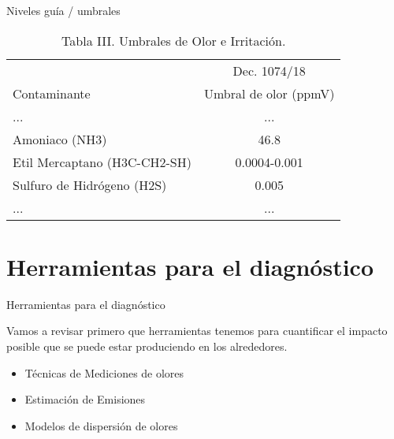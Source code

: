    
\begin{frame}{Niveles guía / umbrales}
    \begin{table}[]
        \centering
        \begin{tabular}{| l | c |}\hline
                          & Dec. 1074/18           \\
             Contaminante & Umbral de olor (ppmV)  \\\hline
             ... & ...    \\
             Amoniaco (NH3)             &   46.8  \\
             Etil Mercaptano (H3C-CH2-SH)           &   0.0004-0.001  \\ 
             Sulfuro de Hidrógeno (H2S) &   0.005  \\
             ... & ...    \\\hline
        \end{tabular}
        \caption{Tabla III. Umbrales de Olor e Irritación.}
    \end{table}
\end{frame}



\section{Herramientas para el diagnóstico}

\begin{frame}{Herramientas para el diagnóstico}

Vamos a revisar primero que herramientas tenemos para cuantificar el impacto posible que se puede estar produciendo en los alrededores.

\begin{itemize}
    \item Técnicas de \alert{Mediciones de olores}
    \item Estimación de \alert{Emisiones} 
    \item \alert{Modelos de dispersión de olores} 
    
\end{itemize}    
\end{frame}


